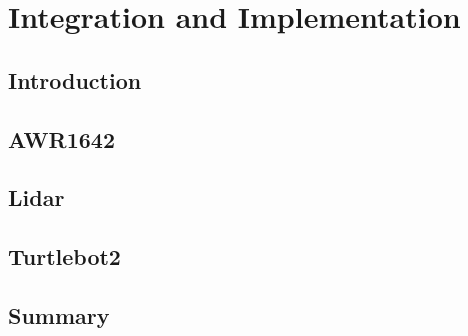 \chapter{Integration and Implementation}

\section{Introduction}




\section{AWR1642}
\section{Lidar}
\section{Turtlebot2}


\section{Summary}   

